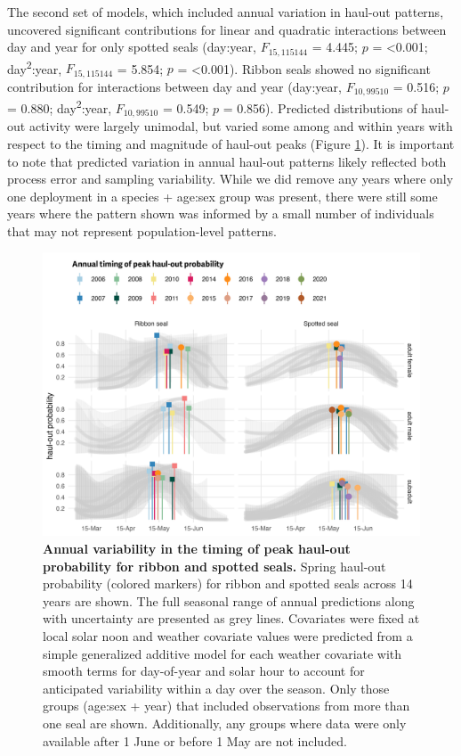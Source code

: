 \documentclass[fleqn,10pt,lineno]{wlpeerj} %
\begin{document}
The second set of models, which included annual variation in haul-out
patterns, uncovered significant contributions for linear and quadratic
interactions between day and year for only spotted seals (day:year,
\(F_{15,115144}\)
= 4.445; \(p\) =
\textless0.001; day\textsuperscript{2}:year,
\(F_{15,115144}\)
= 5.854; \(p\) =
\textless0.001). Ribbon seals showed no significant
contribution for interactions between day and year (day:year,
\(F_{10,99510}\)
= 0.516; \(p\) =
0.880; day\textsuperscript{2}:year,
\(F_{10,99510}\)
= 0.549; \(p\) =
0.856). Predicted distributions of
haul-out activity were largely unimodal, but varied some among and
within years with respect to the timing and magnitude of haul-out peaks
(Figure \ref{fig:annualHO}). It is important to note that predicted
variation in annual haul-out patterns likely reflected both process error
and sampling variability. While we did remove any years where only one
deployment in a species + age:sex group was present, there were still
some years where the pattern shown was informed by a small number of
individuals that may not represent population-level patterns.



\begin{figure}
\includegraphics[width=1\linewidth]{../figures/Figure-011} \caption{\textbf{Annual variability in the timing of peak haul-out probability for ribbon and spotted seals.} \linebreak Spring haul-out probability (colored markers) for ribbon and spotted seals across 14 years are shown. The full seasonal range of annual predictions along with uncertainty are presented as grey lines. Covariates were fixed at local solar noon and weather covariate values were predicted from a simple generalized additive model for each weather covariate with smooth terms for day-of-year and solar hour to account for anticipated variability within a day over the season. Only those groups (age:sex + year) that included observations from more than one seal are shown. Additionally, any groups where data were only available after 1 June or before 1 May are not included.}\label{fig:annualHO}
\end{figure}
\end{document}
